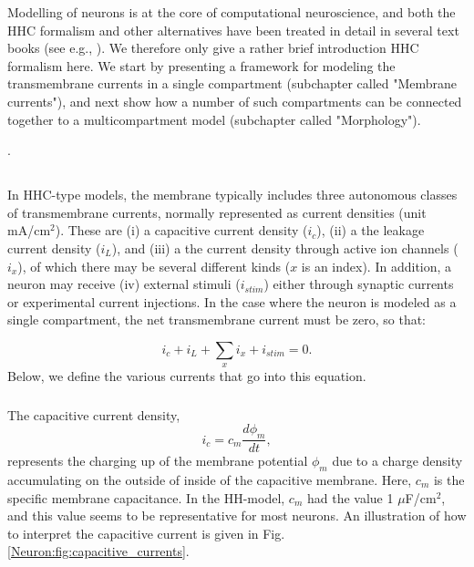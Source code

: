 Modelling of neurons is at the core of computational neuroscience, and both the HHC formalism and other alternatives have been treated in detail in several text books (see e.g., \cite{johnston1994foundations, KockSegev1998, Koch1999, Hille2001, Dayan2005, Sterratt2011}). We therefore only give a rather brief introduction HHC formalism here. We start by presenting a framework for modeling the transmembrane currents in a single compartment (subchapter called "Membrane currents"), and next show how a number of such compartments can be connected together to a multicompartment model (subchapter called "Morphology").

 . 


\subsection{}
\label{sec:membranecurrents}
In HHC-type models, the membrane typically includes three autonomous classes of transmembrane currents, normally represented as current densities (unit mA/cm$^2$). These are (i) a capacitive current density ($i_c$), (ii) a the leakage current density ($i_L$), and (iii) a the current density through active ion channels ($i_x$), of which there may be several different kinds ($x$ is an index). In addition, a neuron may receive  (iv) external stimuli ($i_{stim}$) either through synaptic currents or experimental current injections. In the case where the neuron is modeled as a single compartment, the net transmembrane current must be zero, so that:

\begin{equation}
i_c + i_L + \sum_x{i_x} +  i_{stim} = 0.
\label{eq:singlecomp_zerosum}
\end{equation}
Below, we define the various currents that go into this equation.


\subsubsection{}
The capacitive current density,
\begin{equation}
i_c = c_m \frac{d\phi_m}{dt},
\label{eq:HHcap}
\end{equation}
represents the charging up of the membrane potential $\phi_m$ due to a charge density accumulating on the outside of inside of the capacitive membrane. Here, $c_m$ is the specific membrane capacitance. In the HH-model, $c_m$ had the value
1 $\mu$F/cm$^2$, and this value seems to be representative for most neurons.  An illustration of how to interpret the capacitive current is given in Fig. \ref{Neuron:fig:capacitive_currents}. 

